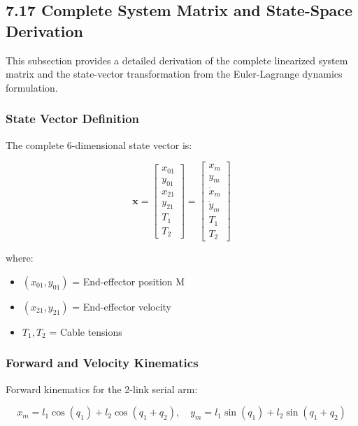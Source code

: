 \subsection{7.17 Complete System Matrix and State-Space Derivation}

This subsection provides a detailed derivation of the complete linearized system matrix and the state-vector transformation from the Euler-Lagrange dynamics formulation.

\subsubsection{State Vector Definition}

The complete 6-dimensional state vector is:

\begin{equation}
\mathbf{x} = \begin{bmatrix}
x_{01} \\
y_{01} \\
x_{21} \\
y_{21} \\
T_1 \\
T_2
\end{bmatrix} = \begin{bmatrix}
x_m \\
y_m \\
\dot{x}_m \\
\dot{y}_m \\
T_1 \\
T_2
\end{bmatrix}
\end{equation}

where:
\begin{itemize}
    \item $(x_{01}, y_{01})$ = End-effector position M
    \item $(x_{21}, y_{21})$ = End-effector velocity
    \item $T_1, T_2$ = Cable tensions
\end{itemize}

\subsubsection{Forward and Velocity Kinematics}

Forward kinematics for the 2-link serial arm:

\begin{equation}
x_m = l_1 \cos(q_1) + l_2 \cos(q_1 + q_2), \quad y_m = l_1 \sin(q_1) + l_2 \sin(q_1 + q_2)
\end{equation}

